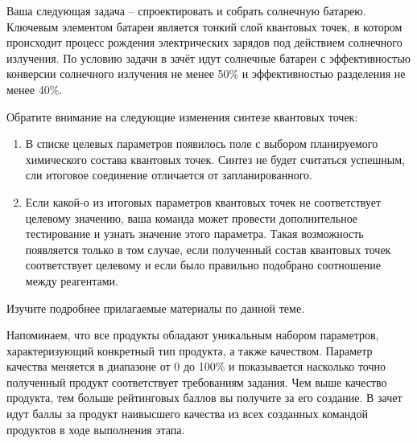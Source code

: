 
Ваша следующая задача -- спроектировать и собрать солнечную батарею. Ключевым элементом батареи является тонкий слой квантовых точек, в котором происходит процесс рождения электрических зарядов под действием солнечного излучения. По условию задачи в зачёт идут солнечные батареи с эффективностью конверсии солнечного излучения не менее 50\% и эффективностью разделения не менее 40\%. 

Обратите внимание на следующие изменения синтезе квантовых точек:

\begin{enumerate}
    \item В списке целевых параметров появилось поле с выбором планируемого химического состава квантовых точек. Синтез не будет считаться успешным, сли итоговое соединение отличается от запланированного.
    \item Если какой-о из итоговых параметров квантовых точек не соответствует целевому значению, ваша команда может провести дополнительное тестирование и узнать значение этого параметра. Такая возможность появляется только в том случае, если полученный состав квантовых точек соответствует целевому и если было правильно подобрано соотношение между реагентами.
\end{enumerate}

Изучите подробнее прилагаемые материалы по данной теме. 

Напоминаем, что все продукты обладают уникальным набором параметров, характеризующий конкретный тип продукта, а также качеством. Параметр качества меняется в диапазоне от 0 до 100\% и показывается насколько точно полученный продукт соответствует требованиям задания. Чем выше качество продукта, тем больше рейтинговых баллов вы получите за его создание. В зачет идут баллы за продукт наивысшего качества из всех созданных командой продуктов в ходе выполнения этапа.
